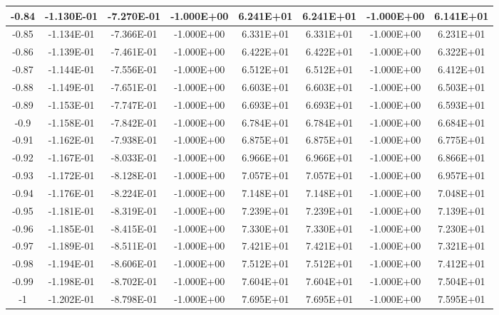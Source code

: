 \documentclass{article}
\begin{document}
\begin{center}
\begin{longtable}{|c|c|c|c|c|c|c|c|}
-0.84 & -1.130E-01 & -7.270E-01 & -1.000E+00 & 6.241E+01 & 6.241E+01 & -1.000E+00 & 6.141E+01 \\ \hline
-0.85 & -1.134E-01 & -7.366E-01 & -1.000E+00 & 6.331E+01 & 6.331E+01 & -1.000E+00 & 6.231E+01 \\ \hline
-0.86 & -1.139E-01 & -7.461E-01 & -1.000E+00 & 6.422E+01 & 6.422E+01 & -1.000E+00 & 6.322E+01 \\ \hline
-0.87 & -1.144E-01 & -7.556E-01 & -1.000E+00 & 6.512E+01 & 6.512E+01 & -1.000E+00 & 6.412E+01 \\ \hline
-0.88 & -1.149E-01 & -7.651E-01 & -1.000E+00 & 6.603E+01 & 6.603E+01 & -1.000E+00 & 6.503E+01 \\ \hline
-0.89 & -1.153E-01 & -7.747E-01 & -1.000E+00 & 6.693E+01 & 6.693E+01 & -1.000E+00 & 6.593E+01 \\ \hline
-0.9 & -1.158E-01 & -7.842E-01 & -1.000E+00 & 6.784E+01 & 6.784E+01 & -1.000E+00 & 6.684E+01 \\ \hline
-0.91 & -1.162E-01 & -7.938E-01 & -1.000E+00 & 6.875E+01 & 6.875E+01 & -1.000E+00 & 6.775E+01 \\ \hline
-0.92 & -1.167E-01 & -8.033E-01 & -1.000E+00 & 6.966E+01 & 6.966E+01 & -1.000E+00 & 6.866E+01 \\ \hline
-0.93 & -1.172E-01 & -8.128E-01 & -1.000E+00 & 7.057E+01 & 7.057E+01 & -1.000E+00 & 6.957E+01 \\ \hline
-0.94 & -1.176E-01 & -8.224E-01 & -1.000E+00 & 7.148E+01 & 7.148E+01 & -1.000E+00 & 7.048E+01 \\ \hline
-0.95 & -1.181E-01 & -8.319E-01 & -1.000E+00 & 7.239E+01 & 7.239E+01 & -1.000E+00 & 7.139E+01 \\ \hline
-0.96 & -1.185E-01 & -8.415E-01 & -1.000E+00 & 7.330E+01 & 7.330E+01 & -1.000E+00 & 7.230E+01 \\ \hline
-0.97 & -1.189E-01 & -8.511E-01 & -1.000E+00 & 7.421E+01 & 7.421E+01 & -1.000E+00 & 7.321E+01 \\ \hline
-0.98 & -1.194E-01 & -8.606E-01 & -1.000E+00 & 7.512E+01 & 7.512E+01 & -1.000E+00 & 7.412E+01 \\ \hline
-0.99 & -1.198E-01 & -8.702E-01 & -1.000E+00 & 7.604E+01 & 7.604E+01 & -1.000E+00 & 7.504E+01 \\ \hline
-1 & -1.202E-01 & -8.798E-01 & -1.000E+00 & 7.695E+01 & 7.695E+01 & -1.000E+00 & 7.595E+01 \\ \hline
\end{longtable}
\end{center}
\end{document}
